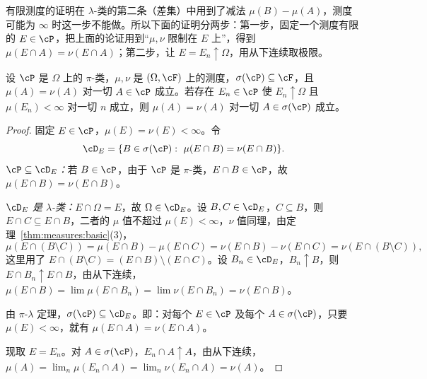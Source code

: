 \begin{remark}[证明思路]
有限测度的证明在 $\lambda$-类的第二条（差集）中用到了减法 $\mu(B)-\mu(A)$，测度可能为 $\infty$ 时这一步不能做。所以下面的证明分两步：第一步，固定一个测度有限的 $E\in\cP$，把上面的论证用到“$\mu,\nu$ 限制在 $E$ 上”，得到 $\mu(E\cap A)=\nu(E\cap A)$；第二步，让 $E=E_n\uparrow\Omega$，用从下连续取极限。
\end{remark}

\begin{theorem}\label{thm:measures:uniqueness}
设 $\cP$ 是 $\Omega$ 上的 $\pi$-类，$\mu,\nu$ 是 $(\Omega,\cF)$ 上的测度，$\sigma(\cP)\subseteq\cF$，且 $\mu(A)=\nu(A)$ 对一切 $A\in\cP$ 成立。若存在 $E_n\in\cP$ 使 $E_n\uparrow\Omega$ 且 $\mu(E_n)<\infty$ 对一切 $n$ 成立，则 $\mu(A)=\nu(A)$ 对一切 $A\in\sigma(\cP)$ 成立。
\end{theorem}
\begin{proof}
固定 $E\in\cP$，$\mu(E)=\nu(E)<\infty$。令
\[
\cD_E=\{B\in\sigma(\cP):\ \mu(E\cap B)=\nu(E\cap B)\}.
\]
\emph{$\cP\subseteq\cD_E$：}若 $B\in\cP$，由于 $\cP$ 是 $\pi$-类，$E\cap B\in\cP$，故 $\mu(E\cap B)=\nu(E\cap B)$。

\emph{$\cD_E$ 是 $\lambda$-类：}$E\cap\Omega=E$，故 $\Omega\in\cD_E$。设 $B,C\in\cD_E$，$C\subseteq B$，则 $E\cap C\subseteq E\cap B$，二者的 $\mu$ 值不超过 $\mu(E)<\infty$，$\nu$ 值同理，由定理~\ref{thm:measures:basic}(3)，
\[
\mu(E\cap(B\setminus C))=\mu(E\cap B)-\mu(E\cap C)=\nu(E\cap B)-\nu(E\cap C)=\nu(E\cap(B\setminus C)),
\]
这里用了 $E\cap(B\setminus C)=(E\cap B)\setminus(E\cap C)$。设 $B_n\in\cD_E$，$B_n\uparrow B$，则 $E\cap B_n\uparrow E\cap B$，由从下连续，$\mu(E\cap B)=\lim\mu(E\cap B_n)=\lim\nu(E\cap B_n)=\nu(E\cap B)$。

由 $\pi$-$\lambda$ 定理，$\sigma(\cP)\subseteq\cD_E$。即：对每个 $E\in\cP$ 及每个 $A\in\sigma(\cP)$，只要 $\mu(E)<\infty$，就有 $\mu(E\cap A)=\nu(E\cap A)$。

现取 $E=E_n$。对 $A\in\sigma(\cP)$，$E_n\cap A\uparrow A$，由从下连续，$\mu(A)=\lim_n\mu(E_n\cap A)=\lim_n\nu(E_n\cap A)=\nu(A)$。
\end{proof}

